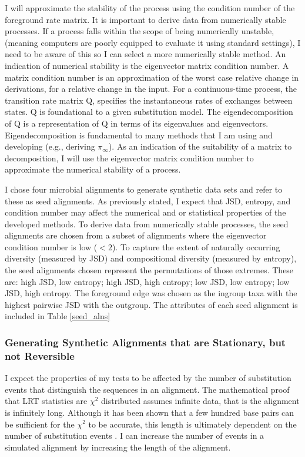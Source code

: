 I will approximate the stability of the process using the condition number of the foreground rate matrix. It is important to derive data from numerically stable processes. If a process falls within the scope of being numerically unstable, (meaning computers are poorly equipped to evaluate it using standard settings), I need to be aware of this so I can select a more numerically stable method. An indication of numerical stability is the eigenvector matrix condition number. A matrix condition number is an approximation of the worst case relative change in derivations, for a relative change in the input. For a continuous-time process, the transition rate matrix $\mathrm{Q}$, specifies the instantaneous rates of exchanges between states. $\mathrm{Q}$ is foundational to a given substitution model. The eigendecomposition of $\mathrm{Q}$ is a representation of $\mathrm{Q}$ in terms of its eigenvalues and eigenvectors. Eigendecomposition is fundamental to many methods that I am using and developing (e.g., deriving $\pi_{\infty}$). As an indication of the suitability of a matrix to decomposition, I will use the eigenvector matrix condition number to approximate the numerical stability of a process.

I chose four microbial alignments to generate synthetic data sets and refer to these as seed alignments. As previously stated, I expect that JSD, entropy, and condition number may affect the numerical and or statistical properties of the developed methods. To derive data from numerically stable processes, the seed alignments are chosen from a subset of alignments where the eigenvector condition number is low ($<2$). To capture the extent of naturally occurring diversity (measured by JSD) and compositional diversity (measured by entropy), the seed alignments chosen represent the permutations of those extremes. These are: high JSD, low entropy; high JSD, high entropy; low JSD, low entropy; low JSD, high entropy. The foreground edge was chosen as the ingroup taxa with the highest pairwise JSD with the outgroup. The attributes of each seed alignment is included in Table \ref{seed_alns} 



\subsubsection{Generating Synthetic Alignments that are Stationary, but not Reversible}
I expect the properties of my tests to be affected by the number of substitution events that distinguish the sequences in an alignment. The mathematical proof that LRT statistics are $\chi^{2}$ distributed assumes infinite data, that is the alignment is infinitely long. Although it has been shown that a few hundred base pairs can be sufficient for the $\chi^{2}$ to be accurate, this length is ultimately dependent on the number of substitution events \citep{Ota2000AppropriateParameters}. I can increase the number of events in a simulated alignment by increasing the length of the alignment.

